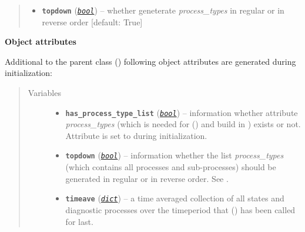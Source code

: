 \documentclass[a4paper,10pt,english]{sphinxmanual}
\begin{document}
\begin{fulllineitems}
\begin{quote}
\begin{description}
\begin{itemize}
\item {} 
\textbf{\texttt{topdown}} (\href{http://docs.python.org/2.7/library/functions.html\#bool}{\emph{\texttt{bool}}}) -- whether geneterate \emph{process\_types} in regular or 
in reverse order {[}default: True{]}

\end{itemize}

\end{description}\end{quote}

\textbf{Object attributes}

Additional to the parent class {\hyperref[api/climlab.process:climlab.process.process.Process]{\emph{}}} ()
following object attributes are generated during initialization:
\begin{quote}\begin{description}
\item[{Variables}] \leavevmode\begin{itemize}
\item {} 
\textbf{\texttt{has\_process\_type\_list}} (\href{http://docs.python.org/2.7/library/functions.html\#bool}{\emph{\texttt{bool}}}) -- information whether attribute \emph{process\_types} 
(which is needed for {\hyperref[api/climlab.process:climlab.process.time_dependent_process.TimeDependentProcess.compute]{\emph{}}} () and build in
)
exists or not. Attribute is set to  
during initialization.

\item {} 
\textbf{\texttt{topdown}} (\href{http://docs.python.org/2.7/library/functions.html\#bool}{\emph{\texttt{bool}}}) -- information whether the list \emph{process\_types} (which 
contains all processes and sub-processes) should be 
generated in regular or in reverse order.
See .

\item {} 
\textbf{\texttt{timeave}} (\href{http://docs.python.org/2.7/library/stdtypes.html\#dict}{\emph{\texttt{dict}}}) -- a time averaged collection of all states and diagnostic 
processes over the timeperiod that 
{\hyperref[api/climlab.process:climlab.process.time_dependent_process.TimeDependentProcess.integrate_years]{\emph{}}} () has been called for last.


\end{itemize}
\end{description}
\end{quote}
\end{fulllineitems}
\end{document}
